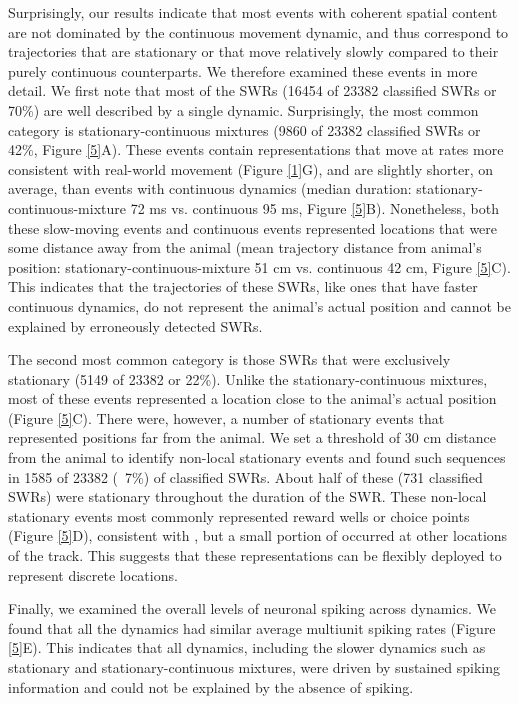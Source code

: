 \documentclass[times, twoside]{zHenriquesLab-StyleBioRxiv}
\begin{document}
Surprisingly, our results indicate that most events with coherent spatial content are not dominated by the continuous movement dynamic, and thus correspond to trajectories that are stationary or that move relatively slowly compared to their purely continuous counterparts. We therefore examined these events in more detail. We first note that most of the SWRs (16454 of 23382 classified SWRs or 70\%) are well described by a single dynamic. Surprisingly, the most common category is stationary-continuous mixtures (9860 of 23382 classified SWRs or 42\%, Figure \ref{5}A). These events contain representations that move at rates more consistent with real-world movement (Figure \ref{1}G), and are slightly shorter, on average, than events with continuous dynamics (median duration: stationary-continuous-mixture 72 ms vs. continuous 95 ms, Figure \ref{5}B). Nonetheless, both these slow-moving events and continuous events represented locations that were some distance away from the animal (mean trajectory distance from animal's position: stationary-continuous-mixture 51 cm vs. continuous 42 cm, Figure \ref{5}C). This indicates that the trajectories of these SWRs, like ones that have faster continuous dynamics, do not represent the animal's actual position and cannot be explained by erroneously detected SWRs.

The second most common category is those SWRs that were exclusively stationary (5149 of 23382 or 22\%). Unlike the stationary-continuous mixtures, most of these events represented a location close to the animal's actual position (Figure \ref{5}C). There were, however, a number of stationary events that represented positions far from the animal. We set a threshold of 30 cm distance from the animal to identify non-local stationary events and found such sequences in 1585 of 23382 (~7\%) of classified SWRs. About half of these (731 classified SWRs) were stationary throughout the duration of the SWR. These non-local stationary events most commonly represented reward wells or choice points (Figure \ref{5}D), consistent with \cite{JaiDistincthippocampalcorticalmemory2017}, but a small portion of occurred at other locations of the track. This suggests that these representations can be flexibly deployed to represent discrete locations.

Finally, we examined the overall levels of neuronal spiking across dynamics. We found that all the dynamics had similar average multiunit spiking rates (Figure \ref{5}E). This indicates that all dynamics, including the slower dynamics such as stationary and stationary-continuous mixtures, were driven by sustained spiking information and could not be explained by the absence of spiking.
\end{document}
